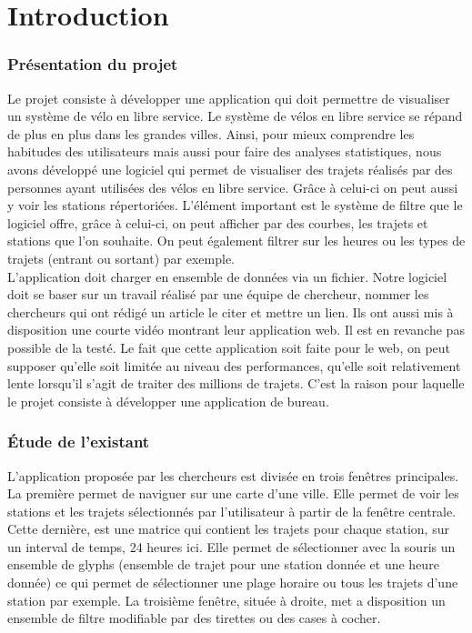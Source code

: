 \documentclass[12pt]{article}
\begin{document}
	
	\newpage
\part{Introduction}

	\section{Présentation du projet}
	Le projet consiste à développer une application qui doit permettre de visualiser
	un système de vélo en libre service. Le système de vélos en libre service se répand
	de plus en plus dans les grandes villes. Ainsi, pour mieux comprendre les habitudes
	des utilisateurs mais aussi pour faire des analyses statistiques, nous avons
	développé une logiciel qui permet de visualiser des trajets réalisés par des personnes
	ayant utilisées des vélos en libre service. Grâce à celui-ci on peut aussi y voir les
	stations répertoriées. L'élément important est le système de filtre que le logiciel offre,
	grâce à celui-ci, on peut afficher par des courbes, les trajets et stations que l’on
	souhaite. On peut également filtrer sur les heures ou les types de trajets (entrant ou
	sortant) par exemple. \\

	L’application doit charger en ensemble de données via un fichier. Notre logiciel doit se
	baser sur un travail réalisé par une équipe de chercheur,
	nommer les chercheurs qui ont rédigé un article le citer et mettre un lien. Ils ont
	aussi mis à disposition une courte vidéo montrant leur application web. Il est en revanche
	pas possible de la testé. Le fait que cette application soit faite pour le web, on peut
	supposer qu’elle soit limitée au niveau des performances,  qu’elle soit relativement
	lente lorsqu’il s’agit de traiter des millions de trajets. C’est la raison pour laquelle 
	le projet consiste à développer une application de bureau.
	
	\section{Étude de l’existant}
	L’application proposée par les chercheurs est divisée en trois fenêtres principales.
	La première permet de naviguer sur une carte d’une ville. Elle permet de voir les
	stations et les trajets sélectionnés par l’utilisateur à partir de la fenêtre centrale.
	Cette dernière, est une matrice qui contient les trajets pour chaque station, sur un
	interval de temps, 24 heures ici. Elle permet de sélectionner avec la souris un
	ensemble de glyphs (ensemble de trajet pour une station donnée et une heure donnée)
	ce qui permet de sélectionner une plage horaire ou tous les trajets d'une station par exemple.
	La troisième fenêtre, située à droite, met a disposition un ensemble de filtre modifiable
	par des tirettes ou des cases à cocher. \\
\end{document}
